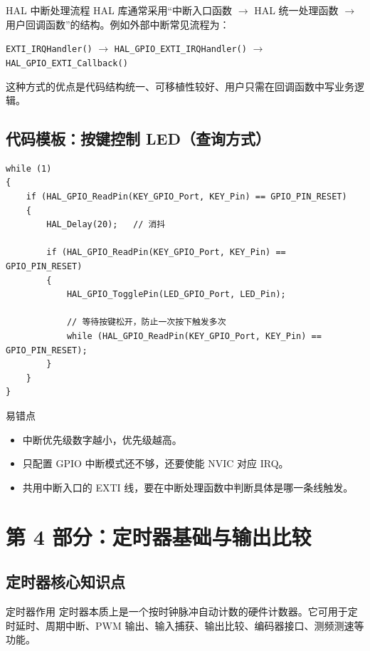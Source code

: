 \documentclass[UTF8,fontset=none,12pt]{ctexart}
\newcommand{\api}[1]{{\footnotesize\nolinkurl{#1}}}
\begin{document}
\begin{pointbox}{HAL 中断处理流程}
HAL 库通常采用“中断入口函数 $\rightarrow$ HAL 统一处理函数 $\rightarrow$ 用户回调函数”的结构。例如外部中断常见流程为：
\begin{center}
\api{EXTI_IRQHandler()} $\rightarrow$ \api{HAL_GPIO_EXTI_IRQHandler()} $\rightarrow$ \api{HAL_GPIO_EXTI_Callback()}
\end{center}
这种方式的优点是代码结构统一、可移植性较好、用户只需在回调函数中写业务逻辑。
\end{pointbox}

\subsection{代码模板：按键控制 LED（查询方式）}
\begin{lstlisting}[style=cstyle]
while (1)
{
    if (HAL_GPIO_ReadPin(KEY_GPIO_Port, KEY_Pin) == GPIO_PIN_RESET)
    {
        HAL_Delay(20);   // 消抖

        if (HAL_GPIO_ReadPin(KEY_GPIO_Port, KEY_Pin) == GPIO_PIN_RESET)
        {
            HAL_GPIO_TogglePin(LED_GPIO_Port, LED_Pin);

            // 等待按键松开，防止一次按下触发多次
            while (HAL_GPIO_ReadPin(KEY_GPIO_Port, KEY_Pin) == GPIO_PIN_RESET);
        }
    }
}
\end{lstlisting}

\begin{warnbox}{易错点}
\begin{itemize}
  \item 中断优先级数字越小，优先级越高。
  \item 只配置 GPIO 中断模式还不够，还要使能 NVIC 对应 IRQ。
  \item 共用中断入口的 EXTI 线，要在中断处理函数中判断具体是哪一条线触发。
\end{itemize}
\end{warnbox}

\section{第 4 部分：定时器基础与输出比较}

\subsection{定时器核心知识点}
\begin{pointbox}{定时器作用}
定时器本质上是一个按时钟脉冲自动计数的硬件计数器。它可用于定时延时、周期中断、PWM 输出、输入捕获、输出比较、编码器接口、测频测速等功能。
\end{pointbox}
\end{document}

